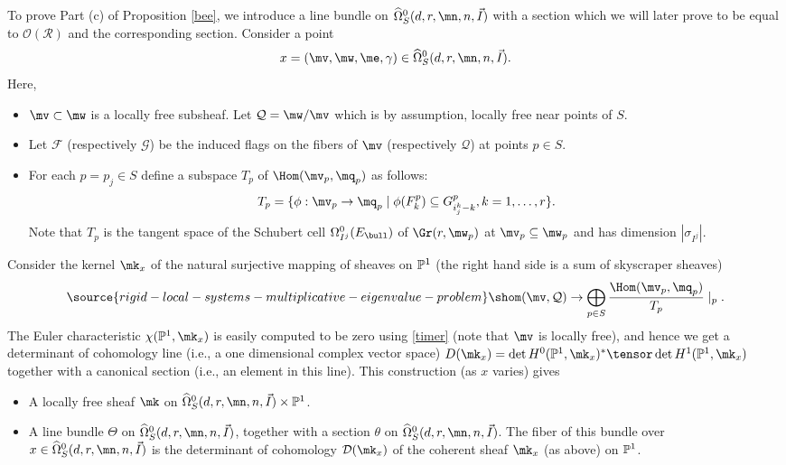 To prove Part (c) of Proposition \ref{bee}, we introduce a line bundle on $\widehat{\Omega}^0_S(d,r,\mn,n,\vec{I})$ with a section which we will later prove to be equal to $\mathcal{O}(\mathcal{R})$ and the corresponding section. Consider a point
$$x=(\mv,\mw,\me,\gamma)\in \widehat{\Omega}^0_S(d,r,\mn,n,\vec{I}).$$
Here,
\begin{itemize}
\item[--]$\mv\subset \mw$ is a locally free subsheaf. Let $\mathcal{Q}=\mw/\mv$ which is by assumption, locally free near points of $S$.
\item[--]Let $\mathcal{F}$ (respectively $\mathcal{G}$) be the induced flags on the fibers of $\mv$ (respectively $\mathcal{Q}$) at points $p\in S$.
\item[--] For each $p=p_j\in S$ define a subspace $T_p$ of $\Hom(\mv_p,\mq_p)$ as follows:
$$T_p=\{\phi: \mv_p\to \mq_p\mid \phi(F^p_{k})\subseteq G^p_{i_j^{k}-k}, k=1,\dots,r \}.$$
Note that $T_p$ is the tangent space of the Schubert cell ${\Omega}^0_{I^j}(E_{\bull})$ of $\Gr(r,\mw_p)$ at $\mv_p\subseteq \mw_p$ and has dimension $|\sigma_{I^j}|$.
\end{itemize}
Consider the kernel $\mk_x$ of the natural surjective mapping of sheaves on $\Bbb{P}^1$  (the right hand side is a sum of skyscraper sheaves)
\begin{equation}\label{sky}
\source{rigid-local-systems-multiplicative-eigenvalue-problem}
\shom(\mv,\mathcal{Q})\to \bigoplus_{p\in S}\frac{\Hom(\mv_p,\mq_p)}{T_p}\mid_p.
\end{equation}
The Euler characteristic $\chi(\Bbb{P}^1,\mk_x)$ is easily computed to be zero  using \eqref{timer} (note that $\mv$ is locally free), and hence we get a determinant of cohomology line (i.e., a one dimensional complex vector space) $D(\mk_x)=\det H^0(\Bbb{P}^1,\mk_x)^*\tensor  \det H^1(\Bbb{P}^1,\mk_x)$
together with a canonical section (i.e., an element in this line). This construction (as $x$ varies) gives
\begin{itemize}
 \item[-] A locally free sheaf $\mk$ on $\widehat{\Omega}^0_S(d,r,\mn,n,\vec{I})\times\Bbb{P}^1$.
\item[-] A line bundle $\Theta$ on $\widehat{\Omega}^0_S(d,r,\mn,n,\vec{I})$, together with a section $\theta$ on $\widehat{\Omega}^0_S(d,r,\mn,n,\vec{I})$. The fiber of this bundle over $x\in \widehat{\Omega}^0_S(d,r,\mn,n,\vec{I})$ is the determinant of cohomology $\mathcal{D}(\mk_x)$ of the coherent sheaf $\mk_x$ (as above) on $\Bbb{P}^1$.
\end{itemize}
